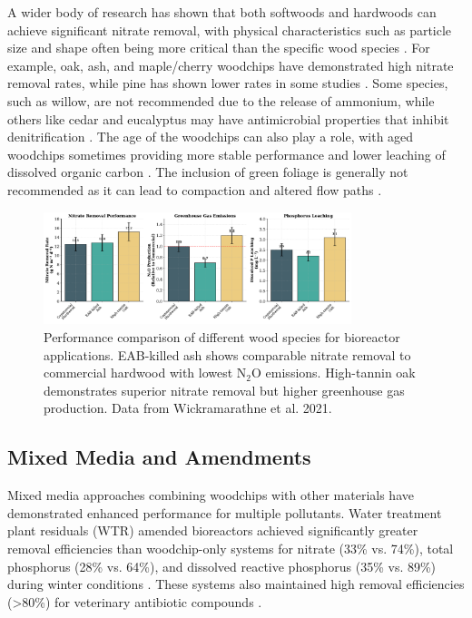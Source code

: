 \documentclass[12pt,a4paper]{article}
\begin{document}
A wider body of research has shown that both softwoods and hardwoods can achieve significant nitrate removal, with physical characteristics such as particle size and shape often being more critical than the specific wood species \citep{new_ref_1}. For example, oak, ash, and maple/cherry woodchips have demonstrated high nitrate removal rates, while pine has shown lower rates in some studies \citep{new_ref_2}. Some species, such as willow, are not recommended due to the release of ammonium, while others like cedar and eucalyptus may have antimicrobial properties that inhibit denitrification \citep{new_ref_4, RN625}. The age of the woodchips can also play a role, with aged woodchips sometimes providing more stable performance and lower leaching of dissolved organic carbon \citep{new_ref_4}. The inclusion of green foliage is generally not recommended as it can lead to compaction and altered flow paths \citep{new_ref_4}.

\begin{figure}[ht]
\centering
\includegraphics[width=0.8\textwidth]{fig9_wood_species_comparison_scientific}
\caption{Performance comparison of different wood species for bioreactor applications. EAB-killed ash shows comparable nitrate removal to commercial hardwood with lowest N$_2$O emissions. High-tannin oak demonstrates superior nitrate removal but higher greenhouse gas production. Data from Wickramarathne et al. 2021.}
\label{fig:wood_species_comparison}
\end{figure}

\subsection{Mixed Media and Amendments}

Mixed media approaches combining woodchips with other materials have demonstrated enhanced performance for multiple pollutants. Water treatment plant residuals (WTR) amended bioreactors achieved significantly greater removal efficiencies than woodchip-only systems for nitrate (33\% vs. 74\%), total phosphorus (28\% vs. 64\%), and dissolved reactive phosphorus (35\% vs. 89\%) during winter conditions \citep{RN625}. These systems also maintained high removal efficiencies (>80\%) for veterinary antibiotic compounds \citep{RN625}.
\end{document}
